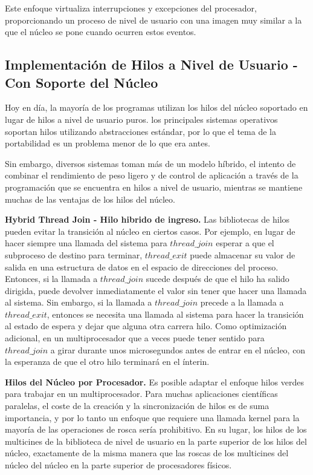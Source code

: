 \documentclass[10pt]{book}
\begin{document}
Este enfoque virtualiza interrupciones y excepciones del procesador, proporcionando un proceso de nivel de usuario con una imagen muy similar a la que el núcleo se pone cuando ocurren estos eventos.

\subsection{Implementación de Hilos a Nivel de Usuario - Con Soporte del Núcleo}
Hoy en día, la mayoría de los programas utilizan los hilos del núcleo soportado en lugar de hilos a nivel de usuario puros. los principales sistemas operativos soportan hilos utilizando abstracciones estándar, por lo que el tema de la portabilidad es un problema menor de lo que era antes.

Sin embargo, diversos sistemas toman más de un modelo híbrido, el intento de combinar el rendimiento de peso ligero y de control de aplicación a través de la programación que se encuentra en hilos a nivel de usuario, mientras se mantiene muchas de las ventajas de los hilos del núcleo.

\textbf{Hybrid Thread Join - Hilo hibrido de ingreso.} Las bibliotecas de hilos pueden evitar la transición al núcleo en ciertos casos. Por ejemplo, en lugar de hacer siempre una llamada del sistema para $thread\_ join$ esperar a que el subproceso de destino para terminar, $thread\_ exit$ puede almacenar su valor de salida en una estructura de datos en el espacio de direcciones del proceso. Entonces, si la llamada a $thread\_ join$ sucede después de que el hilo ha salido dirigida, puede devolver inmediatamente el valor sin tener que hacer una llamada al sistema. Sin embargo, si la llamada a $thread\_ join$ precede a la llamada a $thread\_ exit$, entonces se necesita una llamada al sistema para hacer la transición al estado de espera y dejar que alguna otra carrera hilo. Como optimización adicional, en un multiprocesador que a veces puede tener sentido para $thread\_ join$ a girar durante unos microsegundos antes de entrar en el núcleo, con la esperanza de que el otro hilo terminará en el ínterin.

\textbf{Hilos del Núcleo por Procesador.} Es posible adaptar el enfoque hilos verdes para trabajar en un multiprocesador. Para muchas aplicaciones científicas paralelas, el coste de la creación y la sincronización de hilos es de suma importancia, y por lo tanto un enfoque que requiere una llamada kernel para la mayoría de las operaciones de rosca sería prohibitivo. En su lugar, los hilos de los multicines de la biblioteca de nivel de usuario en la parte superior de los hilos del núcleo, exactamente de la misma manera que las roscas de los multicines del núcleo del núcleo en la parte superior de procesadores físicos.
\end{document}
